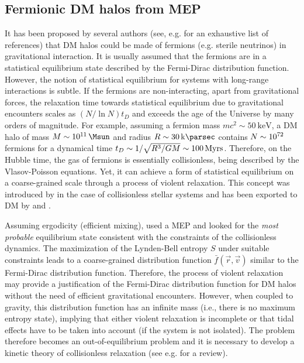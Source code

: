 \subsection{Fermionic DM halos from MEP}
\label{sec:model:rar}

It has been proposed by several authors (see, e.g. \citealp{2020EPJP..135..290C} for an exhaustive list of references) that DM halos could be made of fermions (e.g. sterile neutrinos) in gravitational interaction. It is usually assumed that the fermions are in a statistical equilibrium state described by the Fermi-Dirac distribution function. However, the notion of statistical equilibrium for systems with long-range interactions is subtle. If the fermions are non-interacting, apart from gravitational forces, the relaxation time towards statistical equilibrium due to gravitational encounters scales as $(N/\ln N)t_D$ \citep[see e.g.][]{Binney2008} and exceeds the age of the Universe by many orders of magnitude. For example, assuming a fermion mass $m c^2 \sim \SI{50}{\kilo\eV}$, a DM halo of mass $M\sim \SI{E11}{\Msun}$ and radius $R \sim \SI{30}{\kilo\parsec}$ contains $N\sim \num{E72}$ fermions for a dynamical time $t_D\sim 1/\sqrt{R^3/G M}\sim 100\, {\rm Myrs}$. Therefore, on the Hubble time, the gas of fermions is essentially collisionless, being described by the Vlasov-Poisson equations. Yet, it can achieve a form of statistical equilibrium on a coarse-grained scale through a process of violent relaxation. This concept was introduced  by \cite{1967MNRAS.136..101L} in the case of collisionless stellar systems and has been exported to DM by \citet{1996ApJ...466L...1K} and \citet{2015PhRvD..92l3527C}. 

Assuming ergodicity (efficient mixing), \citet{1967MNRAS.136..101L} used a MEP and looked for the {\it most probable} equilibrium state consistent with the constraints of the collisionless dynamics. The maximization of the Lynden-Bell entropy $S$ under suitable constraints leads to a coarse-grained distribution function $\bar{f}({\vec r},{\vec v})$ similar to the Fermi-Dirac distribution function. Therefore, the process of violent relaxation may provide a justification of the Fermi-Dirac distribution function for DM halos without the need of efficient gravitational encounters. However, when coupled to gravity, this distribution function has an infinite mass (i.e., there is no maximum entropy state), implying that either violent relaxation is incomplete or that tidal effects have to be taken into account (if the system is not isolated). The problem therefore becomes an out-of-equilibrium problem and it is necessary to develop a kinetic theory of collisionless relaxation (see e.g. \citealp{2021arXiv211213664C} for a review).

